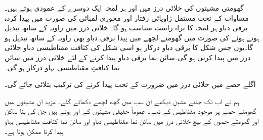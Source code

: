 گھومتی مشینوں کی خلائی درز میں   اور   ہر لمحہ ایک دوسرے کے عمودی ہوتے ہیں۔مساوات   کے تحت مستقل زاویائی  رفتار اور محوری لمبائی کی صورت میں پیدا کردہ برقی دباو  ہر لمحہ   کا براہ راست متناسب ہو گا۔ خلائی درز میں زاویہ کے ساتھ  تبدیل ہوتے ہوئے  کی صورت میں گھومتے لچھے میں پیدا برقی دباو بھی زاویہ کے ساتھ تبدیل ہو گا۔یوں جس شکل کا برقی دباو درکار ہو اسی شکل کی کثافت مقناطیسی دباو خلائی درز میں پیدا کرنی ہو گی۔سائن نما برقی دباو پیدا کرنے کے لئے   خلائی درز میں  سائن نما کثافتِ مقناطیسی بہاو درکار ہو گی۔

اگلے حصے میں خلائی درز میں ضرورت کے تحت   پیدا کرنے کی ترکیب بتلائی جائے گی۔

ہم نے اب تک جتنے مشین دیکھے ان سب میں گچھ لچھے دکھائے گئے۔ مزید  ان مشینوں میں گھومتے حصے پر موجود مقناطیس کے  تھے۔ عموماً حقیقی مشینوں کے   اور  ہوتے ہیں جن کی بنا ساکن اور گھومتے حصوں کے بیچ  خلائی درز میں سائن نما مقناطیسی دباو اور سائن نما  کثافت مقناطیسی بہاو پیدا کرنا ممکن ہوتا ہے۔ 
